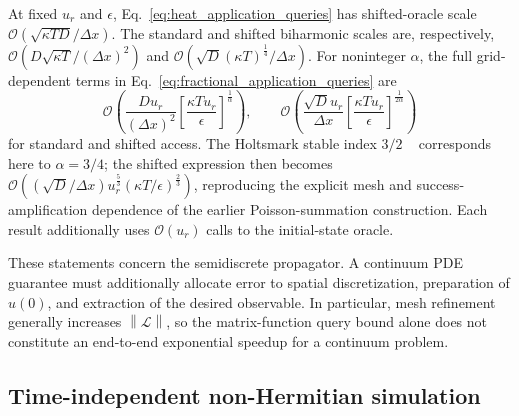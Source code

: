 \documentclass[aps,pra,reprint,floatfix,unsortedaddress,superscriptaddress]{revtex4-2}
\newcommand{\norm}[1]{\left\lVert#1\right\rVert}
\newcommand{\Ocal}{\mathcal{O}}
\begin{document}
At fixed $u_r$ and $\epsilon$, Eq.~\eqref{eq:heat_application_queries}
has shifted-oracle scale
$\Ocal(\sqrt{\kappa TD}/\Delta x)$.  The standard and shifted
biharmonic scales are, respectively,
$\Ocal(D\sqrt{\kappa T}/(\Delta x)^2)$ and
$\Ocal(\sqrt D(\kappa T)^{\frac{1}{4}}/\Delta x)$.  For noninteger $\alpha$,
the full grid-dependent terms in Eq.~\eqref{eq:fractional_application_queries}
are
\begin{equation}
\Ocal\!\left(
\frac{D u_r}{(\Delta x)^2}
\left[\frac{\kappa T u_r}{\epsilon}\right]^{\frac{1}{\alpha}}
\right),
\qquad
\Ocal\!\left(
\frac{\sqrt D u_r}{\Delta x}
\left[\frac{\kappa T u_r}{\epsilon}\right]^{\frac{1}{2\alpha}}
\right)
\label{eq:fractional_grid_queries}
\end{equation}
for standard and shifted access.  The Holtsmark stable index $3/2$
~\cite{zolotarev1986stable} corresponds here to $\alpha=3/4$; the
shifted expression then becomes
$\Ocal((\sqrt D/\Delta x)u_r^{\frac{5}{3}}
(\kappa T/\epsilon)^{\frac{2}{3}})$, reproducing the explicit mesh and
success-amplification dependence of the earlier Poisson-summation
construction.
Each result additionally uses $\Ocal(u_r)$ calls to the initial-state
oracle.

These statements concern the semidiscrete propagator.  A continuum
PDE guarantee must additionally allocate error to spatial
discretization, preparation of $u(0)$, and extraction of the desired
observable.  In particular, mesh refinement generally increases
$\norm{\mathcal L}$, so the matrix-function query bound alone does not
constitute an end-to-end exponential speedup for a continuum problem.

\subsection{Time-independent non-Hermitian simulation}
\label{subsec:nonhermitian}
\end{document}
